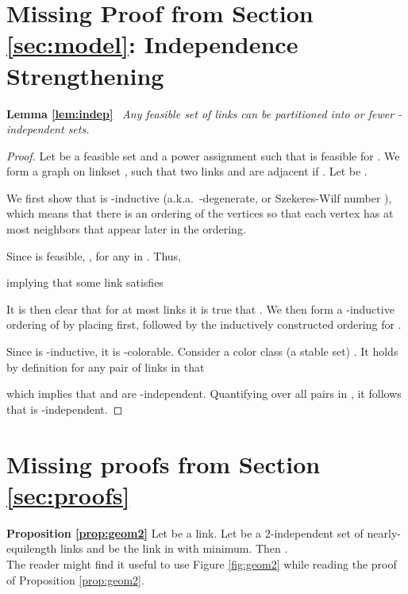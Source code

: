 \documentclass[11pt]{amsart}
\begin{document}

		

\appendix

\section{Missing Proof from Section \ref{sec:model}: Independence Strengthening}
\label{app:model}

\noindent \textbf{Lemma \ref{lem:indep}}\ 
\emph{
Any feasible set of links can be partitioned into 
 or fewer -independent sets.
}
\begin{proof}
Let  be a feasible set and 
 a power assignment such that  is feasible for .  We form
a graph  on linkset , such that two links  and  are
adjacent if .
Let  be .



We first show that  is -inductive (a.k.a.\ -degenerate,
or Szekeres-Wilf number ), which means that there is an ordering of the
vertices so that each vertex has at most  neighbors that appear
later in the ordering.

Since  is feasible, , for any  in .
Thus, 

 implying that some link  satisfies

It is then clear that for at most  links 
 it is true that .
We then form a -inductive ordering of 
by placing  first, followed by the inductively constructed ordering for . 

Since  is -inductive, it is -colorable.
Consider a color class (a stable set) .
It holds by definition for any pair  of links in 
that

which implies that  and  are -independent.
Quantifying over all pairs in , it follows that  is
-independent. 
\end{proof}


\section{Missing proofs from Section \ref{sec:proofs}}
\label{app:proof-effective}







\noindent \textbf{Proposition \ref{prop:geom2}}  Let  be a link.  Let  be a 2-independent set of
nearly-equilength links and  be the link in  with 
minimum. Then .
\\

The reader might find it useful to use Figure \ref{fig:geom2} while reading the proof of Proposition \ref{prop:geom2}.
\end{document}
